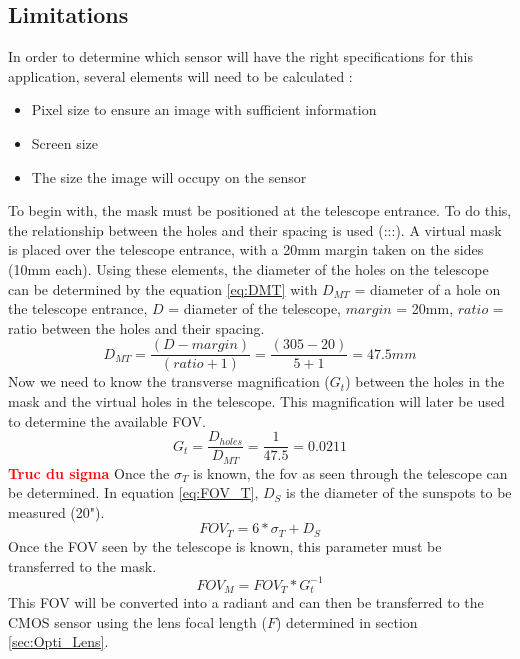 \subsection{Limitations}
In order to determine which sensor will have the right specifications for this application,
several elements will need to be calculated :
\begin{itemize}
    \item Pixel size to ensure an image with sufficient information
    \item Screen size
    \item The size the image will occupy on the sensor
\end{itemize}
\bigbreak
To begin with, the mask must be positioned at the telescope entrance. To do this, the relationship between
the holes and their spacing is used (:::). A virtual mask is placed over the telescope entrance,
with a 20mm margin taken on the sides (10mm each). Using these elements, the diameter of the holes on the
telescope can be determined by the equation \ref{eq:DMT} with $D_{MT}$ = diameter of a hole on the telescope entrance,
$D$ = diameter of the telescope, $margin$ = 20mm, $ratio$ = ratio between the holes and their spacing.
\begin{equation}\label{eq:DMT}
    D_{MT} = \frac{(D-margin)}{(ratio + 1)} = \frac{(305-20)}{5+1} = 47.5 mm
\end{equation}
Now we need to know the transverse magnification ($G_t$) between the holes in the mask and the virtual holes in the telescope.
This magnification will later be used to determine the available FOV.
\begin{equation}
    G_t = \frac{D_{holes}}{D_{MT}} = \frac{1}{47.5} = 0.0211
\end{equation}
\textbf{\textcolor{red}{Truc du sigma}}
\newline
Once the $\sigma_T$ is known, the fov as seen through the telescope can be determined. In equation \ref{eq:FOV_T}, $D_S$ is the diameter
of the sunspots to be measured (20").
\begin{equation}\label{eq:FOV_T}
    FOV_T = 6 * \sigma_T + D_S
\end{equation}
Once the FOV seen by the telescope is known, this parameter must be transferred to the mask.
\begin{equation}
    FOV_M = FOV_T * G_t^{-1}
\end{equation}
This FOV will be converted into a radiant and can then be transferred to the CMOS sensor
using the lens focal length ($F$) determined in section \ref{sec:Opti_Lens}.
